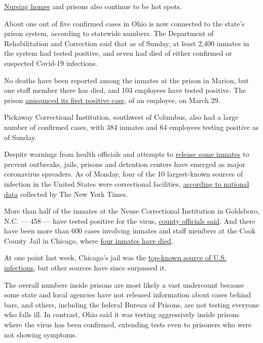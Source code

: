 \href{https://www.nytimes.com/2020/04/19/nyregion/coronavirus-nj-andover-nursing-home-deaths.html}{Nursing
homes} and prisons also continue to be hot spots.

About one out of five confirmed cases in Ohio is now connected to the
state's prison system, according to statewide numbers. The Department of
Rehabilitation and Correction said that as of Sunday, at least 2,400
inmates in the system had tested positive, and seven had died of either
confirmed or suspected Covid-19 infections.

No deaths have been reported among the inmates at the prison in Marion,
but one staff member there has died, and 103 employees have tested
positive. The prison
\href{https://www.drc.ohio.gov/Family/COVID-19-UPDATES}{announced its
first positive case}, of an employee, on March 29.

Pickaway Correctional Institution, southwest of Columbus, also had a
large number of confirmed cases, with 384 inmates and 64 employees
testing positive as of Sunday.

Despite warnings from health officials and attempts to
\href{https://www.nytimes.com/2020/03/30/us/coronavirus-prisons-jails.html}{release
some inmates} to prevent outbreaks, jails, prisons and detention centers
have emerged as major coronavirus spreaders. As of Monday, four of the
10 largest-known sources of infection in the United States were
correctional facilities,
\href{https://www.nytimes.com/interactive/2020/us/coronavirus-us-cases.html}{according
to national data} collected by The New York Times.

More than half of the inmates at the Neuse Correctional Institution in
Goldsboro, N.C. --- 458 --- have tested positive for the virus,
\href{https://www.waynegov.com/946/Coronavirus-COVID-19}{county
officials said}. And there have been more than 600 cases involving
inmates and staff members at the Cook County Jail in Chicago, where
\href{https://www.chicagotribune.com/news/breaking/ct-4th-ccj-covid19-death-20200420-fwwoavnzrzfznnymlebyq2umwi-story.html}{four
inmates have died}.

At one point last week, Chicago's jail was the
\href{https://www.nytimes.com/2020/04/08/us/coronavirus-cook-county-jail-chicago.html}{top-known
source of U.S. infections}, but other sources have since surpassed it.

The overall numbers inside prisons are most likely a vast undercount
because some state and local agencies have not released information
about cases behind bars, and others, including the federal Bureau of
Prisons, are not testing everyone who falls ill. In contrast, Ohio said
it was testing aggressively inside prisons where the virus has been
confirmed, extending tests even to prisoners who were not showing
symptoms.

